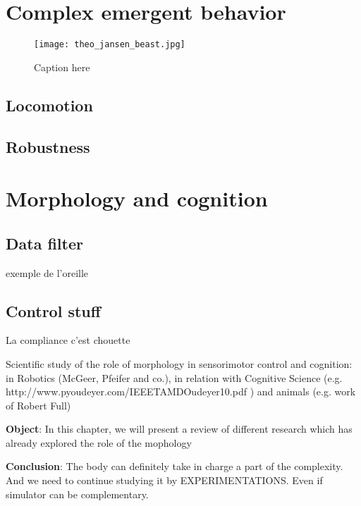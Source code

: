 \section{Complex emergent behavior} %


\begin{figure}[]
\centering
    \hfil
    \hfil
    \caption{}
    \label{fig:}
\end{figure}


\begin{figure}[]
    \begin{center}
        \texttt{[image: theo\_jansen\_beast.jpg]}
    \end{center}
    \caption{Caption here}
    \label{fig:figure1}
\end{figure}










\subsection{Locomotion} %

\subsection{Robustness} %


\section{Morphology and cognition} %

\subsection{Data filter} %

exemple de l'oreille

\subsection{Control stuff} %

La compliance c'est chouette


Scientific study of the role of morphology in sensorimotor control and cognition: in Robotics (McGeer, Pfeifer and co.), in relation with Cognitive Science (e.g.
http://www.pyoudeyer.com/IEEETAMDOudeyer10.pdf ) and animals (e.g.
work of Robert Full)

\textbf{Object}: In this chapter, we will present a review of different research which has already explored the role of the mophology


\textbf{Conclusion}: The body can definitely take in charge a part of the complexity.
And we need to continue studying it by EXPERIMENTATIONS.
Even if simulator can be complementary.

